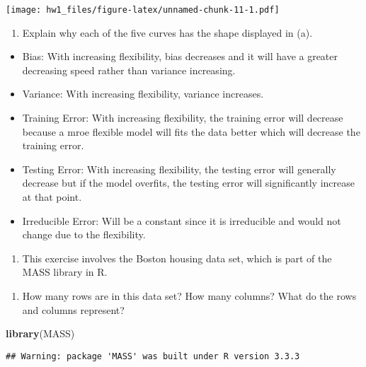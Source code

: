 \documentclass[]{article}
\newenvironment{Shaded}{\begin{snugshade}}{\end{snugshade}}
\newcommand{\KeywordTok}[1]{\textcolor[rgb]{0.13,0.29,0.53}{\textbf{#1}}}
\newcommand{\NormalTok}[1]{#1}
\providecommand{\tightlist}{%
  \setlength{\itemsep}{0pt}\setlength{\parskip}{0pt}}
\begin{document}
\texttt{[image: hw1\_files/figure-latex/unnamed-chunk-11-1.pdf]}

\begin{enumerate}
\def\labelenumi{(\alph{enumi})}
\setcounter{enumi}{1}
\tightlist
\item
  Explain why each of the five curves has the shape displayed in (a).
\end{enumerate}

\begin{itemize}
\item
  Bias: With increasing flexibility, bias decreases and it will have a
  greater decreasing speed rather than variance increasing.
\item
  Variance: With increasing flexibility, variance increases.
\item
  Training Error: With increasing flexibility, the training error will
  decrease because a mroe flexible model will fits the data better which
  will decrease the training error.
\item
  Testing Error: With increasing flexibility, the testing error will
  generally decrease but if the model overfits, the testing error will
  significantly increase at that point.
\item
  Irreducible Error: Will be a constant since it is irreducible and
  would not change due to the flexibility.
\end{itemize}

\begin{enumerate}
\def\labelenumi{\arabic{enumi}.}
\setcounter{enumi}{5}
\tightlist
\item
  This exercise involves the Boston housing data set, which is part of
  the MASS library in R.
\end{enumerate}

\begin{enumerate}
\def\labelenumi{(\alph{enumi})}
\tightlist
\item
  How many rows are in this data set? How many columns? What do the rows
  and columns represent?
\end{enumerate}

\begin{Shaded}
\begin{Highlighting}[]
\KeywordTok{library}\NormalTok{(MASS)}
\end{Highlighting}
\end{Shaded}

\begin{verbatim}
## Warning: package 'MASS' was built under R version 3.3.3
\end{verbatim}
\end{document}
